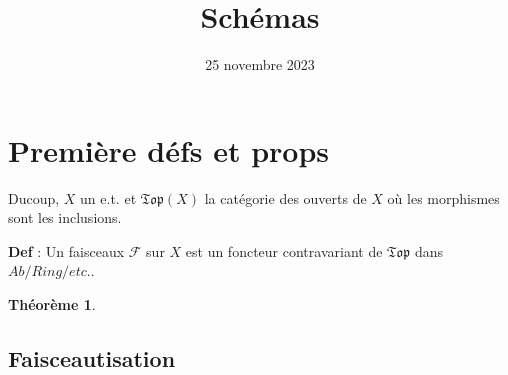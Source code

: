 \documentclass[12pt]{article}
\title{Schémas}
\date{25 novembre 2023}
\newcommand{\F}{\mathcal{F}}
\newcommand{\Topo}{\mathfrak{T}\mathfrak{o}\mathfrak{p}}
\theoremstyle{plain}
\newtheorem{thm}[subsubsection]{Th\'eor\`eme}
\theoremstyle{definition}
\begin{document}
\tableofcontents
\maketitle


\section{Première défs et props}
Ducoup, $X$ un e.t. et $\Topo(X)$ la catégorie des ouverts de $X$ où les morphismes sont les inclusions.

\textbf{\color{wgrey} Def} : Un faisceaux $\F$ sur $X$ est un foncteur contravariant de $\Topo$ dans $Ab/Ring/etc.$.

\begin{thm}
    
\end{thm}
\subsection{Faisceautisation}
\end{document}
